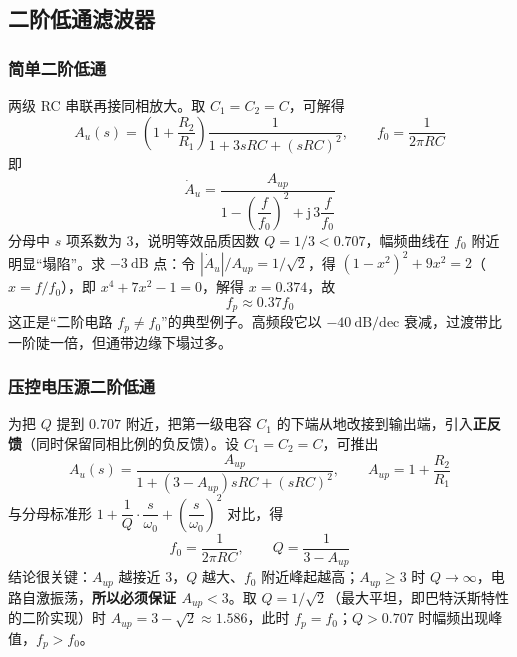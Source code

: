 \subsection{二阶低通滤波器}
\subsubsection{简单二阶低通}
两级 RC 串联再接同相放大。取 $C_1=C_2=C$，可解得
\begin{equation}
A_u(s) = \left(1+\frac{R_2}{R_1}\right)\frac{1}{1+3sRC+(sRC)^2},
\qquad f_0=\frac{1}{2\pi RC}
\end{equation}
即
\begin{equation}
\dot A_u=\frac{A_{up}}{1-\left(\dfrac{f}{f_0}\right)^2+\mathrm{j}\,3\dfrac{f}{f_0}}
\end{equation}
分母中 $s$ 项系数为 3，说明等效品质因数 $Q=1/3<0.707$，幅频曲线在 $f_0$ 附近明显“塌陷”。求 $-3\ \mathrm{dB}$ 点：令 $|\dot A_u|/A_{up}=1/\sqrt2$，得 $(1-x^2)^2+9x^2=2$（$x=f/f_0$），即 $x^4+7x^2-1=0$，解得 $x=0.374$，故
\begin{equation}
f_p \approx 0.37 f_0
\end{equation}
这正是“二阶电路 $f_p\neq f_0$”的典型例子。高频段它以 $-40\ \mathrm{dB/dec}$ 衰减，过渡带比一阶陡一倍，但通带边缘下塌过多。

\subsubsection{压控电压源二阶低通}
为把 $Q$ 提到 $0.707$ 附近，把第一级电容 $C_1$ 的下端从地改接到输出端，引入\textbf{正反馈}（同时保留同相比例的负反馈）。设 $C_1=C_2=C$，可推出
\begin{equation}
A_u(s) = \frac{A_{up}}{1+(3-A_{up})sRC+(sRC)^2},\qquad A_{up}=1+\frac{R_2}{R_1}
\end{equation}
与分母标准形 $1+\dfrac{1}{Q}\cdot\dfrac{s}{\omega_0}+\left(\dfrac{s}{\omega_0}\right)^2$ 对比，得
\begin{equation}
f_0=\frac{1}{2\pi RC},\qquad Q=\frac{1}{3-A_{up}}
\end{equation}
结论很关键：$A_{up}$ 越接近 3，$Q$ 越大、$f_0$ 附近峰起越高；$A_{up}\ge 3$ 时 $Q\to\infty$，电路自激振荡，\textbf{所以必须保证 $A_{up}<3$}。取 $Q=1/\sqrt2$（最大平坦，即巴特沃斯特性的二阶实现）时 $A_{up}=3-\sqrt2\approx1.586$，此时 $f_p=f_0$；$Q>0.707$ 时幅频出现峰值，$f_p>f_0$。

